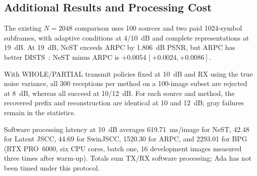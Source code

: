 \subsection{Additional Results and Processing Cost}
The existing $N=2048$ comparison uses 100 sources and two paid 1024-symbol subframes, with adaptive conditions at 4/10~dB and complete representations at 19~dB. At 19~dB, NeST exceeds ARPC by 1.806~dB PSNR, but ARPC has better DISTS~\cite{dists}: NeST minus ARPC is $+0.0054\,[+0.0024,+0.0086]$.

With WHOLE/PARTIAL transmit policies fixed at 10~dB and RX using the true noise variance, all 300 receptions per method on a 100-image subset are rejected at 8~dB, whereas all succeed at 10/12~dB. For each source and method, the recovered prefix and reconstruction are identical at 10 and 12~dB; gray failures remain in the statistics.

Software processing latency at 10~dB averages 619.71~ms/image for NeST, 42.48 for Latent JSCC, 44.69 for SwinJSCC, 1520.30 for ARPC, and 2293.01 for BPG (RTX PRO~6000, six CPU cores, batch one, 16 development images measured three times after warm-up). Totals sum TX/RX software processing; Ada has not been timed under this protocol.
